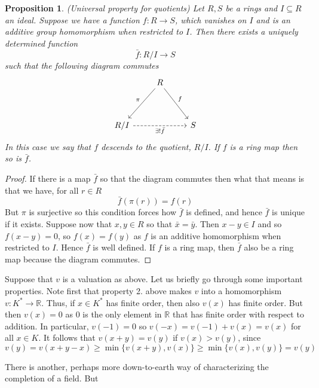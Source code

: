 \documentclass{article}
\newtheorem{proposition}{Proposition}[section]
\newcommand{\mbb}[1]{\mathbb{#1}}
\begin{document}
\begin{proposition}(Universal property for quotients) \label{prop: Universal property for quotients}
    Let $R,S$ be a rings and $I \subseteq R$ an ideal. Suppose we have a function $f : R \to S$, which vanishes on $I$ and is an additive group homomorphism when restricted to $I$. Then there exists a uniquely determined function $$\bar f : R / I \to S$$
    such that the following diagram commutes
\[\begin{tikzcd}
	& R \\
	\\
	{R/I} && S
	\arrow["{\exists! \bar f}"', dashed, from=3-1, to=3-3]
	\arrow["\pi"', from=1-2, to=3-1]
	\arrow["f", from=1-2, to=3-3]
\end{tikzcd}\]
    In this case we say that $f$ descends to the quotient, $R / I$. If $f$ is a ring map then so is $\bar f$.  
\end{proposition}
\begin{proof}
    If there is a map $\bar f$ so that the diagram commutes then what that means is that we have, for all $r \in R$ 
    $$\bar f (\pi(r)) = f(r)$$
    But $\pi$ is surjective so this condition forces how $\bar f$ is defined, and hence $\bar f$ is unique if it exists. Suppose now that $x,y \in R$ so that $\bar x = \bar y$. Then $x-y \in I$ and so $f(x-y) = 0$, so $f(x) = f(y)$ as $f$ is an additive homomorphism when restricted to $I$. Hence $\bar f$ is well defined. If $f$ is a ring map, then $\bar f$ also be a ring map because the diagram commutes. 
\end{proof}



Suppose that $v$ is a valuation as above. Let us briefly go through some important properties. Note first that property 2. above makes $v$ into a homomorphism $v : K^* \to \mbb R$. Thus, if $x \in K^*$ has finite order, then also $v(x)$ has finite order. But then $v(x) = 0$ as $0$ is the only element in $\mbb R$ that has finite order with respect to addition. In particular, $v(-1) = 0$ so $v(-x) = v(-1) + v(x) = v(x)$ for all $x \in K$. It follows that $v(x + y) = v(y)$ if $v(x) > v(y)$, since
$$v(y) = v(x + y - x) \geq \min \{v(x+y), v(x)\} \geq \min \{v(x), v(y)\} = v(y)$$


There is another, perhaps more down-to-earth way of characterizing the completion of a field. But 
\end{document}
